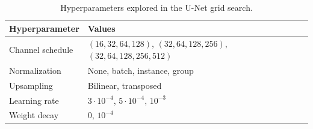 \begin{table}[t]
	\centering
	\caption{Hyperparameters explored in the U-Net grid search.}
	\label{tab:unet_grid_search}
	\begin{tabular}{ll}
		\toprule
		Hyperparameter & Values \\
		\midrule
		Channel schedule & $(16,32,64,128)$, $(32,64,128,256)$, $(32,64,128,256,512)$ \\
		Normalization & None, batch, instance, group \\
		Upsampling & Bilinear, transposed \\
		Learning rate & $3\cdot10^{-4}$, $5\cdot10^{-4}$, $10^{-3}$ \\
		Weight decay & $0$, $10^{-4}$ \\
		\bottomrule
	\end{tabular}
\end{table}